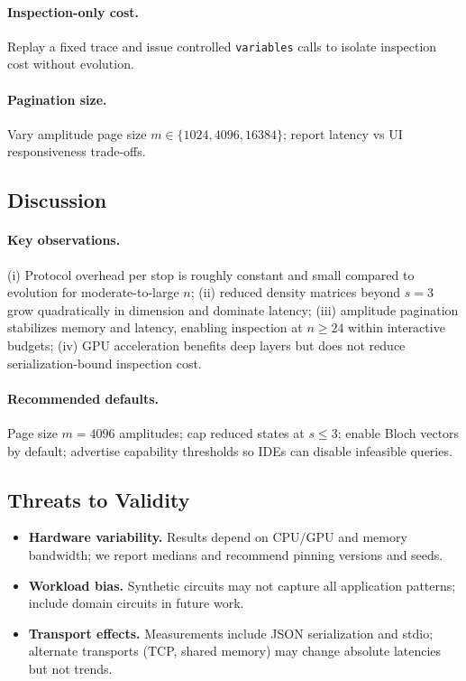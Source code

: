 \documentclass[12pt]{article}
\begin{document}
\begin{itemize}
\paragraph{Inspection-only cost.}
Replay a fixed trace and issue controlled \texttt{variables} calls to isolate inspection cost without evolution.

\paragraph{Pagination size.}
Vary amplitude page size $m \in \{1024, 4096, 16384\}$; report latency vs UI responsiveness trade-offs.

\subsection{Discussion}

\paragraph{Key observations.}
(i) Protocol overhead per stop is roughly constant and small compared to evolution for moderate-to-large $n$; (ii) reduced density matrices beyond $s=3$ grow quadratically in dimension and dominate latency; (iii) amplitude pagination stabilizes memory and latency, enabling inspection at $n \ge 24$ within interactive budgets; (iv) GPU acceleration benefits deep layers but does not reduce serialization-bound inspection cost.

\paragraph{Recommended defaults.}
Page size $m=4096$ amplitudes; cap reduced states at $s \le 3$; enable Bloch vectors by default; advertise capability thresholds so IDEs can disable infeasible queries.

\subsection{Threats to Validity}

\begin{itemize}
  \item \textbf{Hardware variability.} Results depend on CPU/GPU and memory bandwidth; we report medians and recommend pinning versions and seeds.
  \item \textbf{Workload bias.} Synthetic circuits may not capture all application patterns; include domain circuits in future work.
  \item \textbf{Transport effects.} Measurements include JSON serialization and stdio; alternate transports (TCP, shared memory) may change absolute latencies but not trends.
\end{itemize}


\end{itemize}
\end{document}
